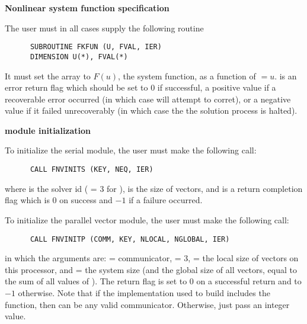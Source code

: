 \begin{Steps}
 
\item {\bf Nonlinear system function specification}
  
  The user must in all cases supply the following {\F} routine
\begin{verbatim}
      SUBROUTINE FKFUN (U, FVAL, IER)
      DIMENSION U(*), FVAL(*)
\end{verbatim}
  It must set the  array to $F(u)$, the system function,
  as a function of $=u$.  
   is an error return flag which should be set to $0$ if successful,
  a positive value if a recoverable error occurred (in which case {\kinsol}
  will attempt to corret), or a negative value if it failed unrecoverably
  (in which case the the solution process is halted).

\item  {\bf {\nvector} module initialization}

  {\s} To initialize the serial {\nvector} module, the user must make the
  following call:
\begin{verbatim}
      CALL FNVINITS (KEY, NEQ, IER)
\end{verbatim}
  where 
   is the solver id ( = 3 for {\kinsol}),
   is the size of vectors, and
   is a  return completion flag which is $0$ on success and $-1$ 
  if a failure occurred.
  
  {\p} To initialize the parallel vector module, the user must make the
  following call:
\begin{verbatim}
      CALL FNVINITP (COMM, KEY, NLOCAL, NGLOBAL, IER)
\end{verbatim}
  in which the arguments are:  = {\mpi} communicator,  = 3,
   = the local size of
  vectors on this processor, and  = the system size (and the global
  size of all vectors, equal to the sum of all values of ).
  The return flag  is set to $0$ on a successful return and to $-1$
  otherwise. Note that if the {\mpi} implementation used to build {\sundials}
  includes the  function, then  can be any valid
  {\mpi} communicator. Otherwise, just pass an integer value.


\end{Steps}
